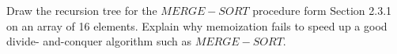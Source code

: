\begin{homeworkProblem}
Draw the recursion tree for the $MERGE-SORT$ procedure form Section 2.3.1 on an
array of 16 elements. Explain why memoization fails to speed up a good divide-
and-conquer algorithm such as $MERGE-SORT$.

\segline

\solution


\end{homeworkProblem}

